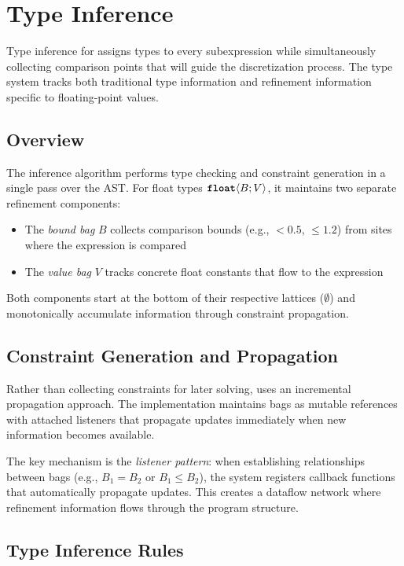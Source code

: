 \section{Type Inference}\label{sec:type-inference}

Type inference for \Slice{} assigns types to every subexpression while simultaneously collecting comparison points that will guide the discretization process. The type system tracks both traditional type information and refinement information specific to floating-point values.

\subsection{Overview}

The inference algorithm performs type checking and constraint generation in a single pass over the AST. For float types $\text{\ttfamily\bfseries float}\langle B; V \rangle$, it maintains two separate refinement components:
\begin{itemize}
    \item The \emph{bound bag} $B$ collects comparison bounds (e.g., $<0.5$, $\leq 1.2$) from sites where the expression is compared
    \item The \emph{value bag} $V$ tracks concrete float constants that flow to the expression
\end{itemize}

Both components start at the bottom of their respective lattices ($\emptyset$) and monotonically accumulate information through constraint propagation.

\subsection{Constraint Generation and Propagation}

Rather than collecting constraints for later solving, \Slice{} uses an incremental propagation approach. The implementation maintains bags as mutable references with attached listeners that propagate updates immediately when new information becomes available.

The key mechanism is the \emph{listener pattern}: when establishing relationships between bags (e.g., $B_1 = B_2$ or $B_1 \leq B_2$), the system registers callback functions that automatically propagate updates. This creates a dataflow network where refinement information flows through the program structure.

\subsection{Type Inference Rules}

